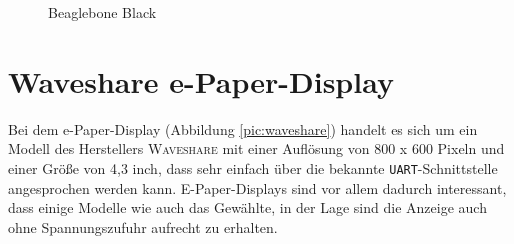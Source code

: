 \begin{figure}[ht]
  \centering
  \caption{Beaglebone Black}
  \label{pic:Beaglebone}
\end{figure}


\section{Waveshare e-Paper-Display}
Bei dem e-Paper-Display (Abbildung \ref{pic:waveshare}) handelt es sich um ein Modell des Herstellers \textsc{Waveshare} mit einer Auflösung von 800 x 600 Pixeln und einer Größe von 4,3 inch, dass sehr einfach über die bekannte \texttt{UART}-Schnittstelle angesprochen werden kann. 
E-Paper-Displays sind vor allem dadurch interessant, dass einige Modelle wie auch das Gewählte, in der Lage sind die Anzeige auch ohne Spannungszufuhr aufrecht zu erhalten.

